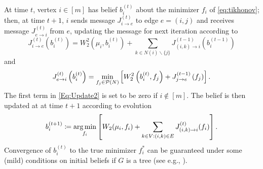 \documentclass[letterpaper]{article} %
\begin{document}
At time $t$, vertex $i\in [m]$ has belief $b^{(t)}_i$ about the minimizer $f_i$ of \eqref{eq:tikhonov}; then, at time $t+1$, $i$ sends message $J^{(t)}_{i\to e}$ to edge $e=(i, j)$ and receives message $J^{(t)}_{e\to i}$ from $e$, updating the message for next iteration according to
\begin{equation}\label{Eq:Update2}
J^{(t)}_{i\to e} \left(b^{(t)}_i\right) = W_2^2\left(\mu_i, b^{(t)}_i\right) + \sum_{k\in N(i)\backslash \{j\}}J^{(t-1)}_{(i,k)\to i}\left(b^{(t-1)}_i\right)
\end{equation}
and 
\begin{equation}\label{Eq:Update}
    J^{(t)}_{e\to i}\left(b^{(t)}_i\right) =  \min_{f_j\in \P(N)}\left[W_2^2\left(b^{(t)}_i, f_j\right) + J^{(t-1)}_{j\to e}\left(f_j\right)\right].
\end{equation}
The first term in \eqref{Eq:Update2} is set to be zero if $i\notin [m]$. The belief is then updated at at time $t+1$ according to evolution
\begin{equation*}
b^{(t+1)}_i \coloneqq \argmin_{f_i} \left[W_2(\mu_i, f_i) + \sum_{k\in V: (i, k)\in E } J^{(t)}_{(i, k)\to i}(f_i)\right].
\end{equation*}
Convergence of $b_i^{(t)}$ to the true minimizer $f^*_i$ can be guaranteed under some (mild) conditions on initial beliefs if $G$ is a tree (see e.g., \cite{min_Sum}).
\end{document}
